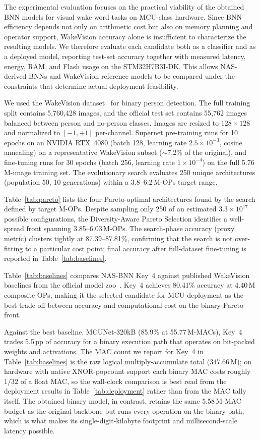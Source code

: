 \documentclass[conference]{IEEEtran}
\begin{document}
The experimental evaluation focuses on the practical viability of the obtained BNN models for visual wake-word tasks on MCU-class hardware.
Since BNN efficiency depends not only on arithmetic cost but also on memory planning and operator support, WakeVision accuracy alone is insufficient to characterize the resulting models.
We therefore evaluate each candidate both as a classifier and as a deployed model, reporting test-set accuracy together with measured latency, energy, RAM, and Flash usage on the STM32H7B3I-DK.
This allows NAS-derived BNNs and WakeVision reference models to be compared under the constraints that determine actual deployment feasibility.

We used the WakeVision dataset~\cite{banbury2025wakevision} for binary person detection. The full training split contains 5{,}760{,}428 images, and the official test set contains 55{,}762 images balanced between person and no-person classes. Images are resized to $128 \times 128$ and normalized to $[-1,+1]$ per-channel. Supernet pre-training runs for 10 epochs on an NVIDIA RTX~4080 (batch 128, learning rate $2.5\times10^{-3}$, cosine annealing) on a representative WakeVision subset ($\sim${7.2}\% of the original), and fine-tuning runs for 30 epochs (batch 256, learning rate $1\times10^{-4}$) on the full 5.76\,M-image training set. The evolutionary search evaluates 250 unique architectures (population 50, 10 generations) within a 3.8--6.2\,M-OPs target range.

Table~\ref{tab:pareto} lists the four Pareto-optimal architectures found by the search defined by target M-OPs.
Despite sampling only 250 of an estimated $3.3\times10^{17}$ possible configurations, the Diversity-Aware Pareto Selection identifies a well-spread front spanning 3.85--6.03\,M-OPs.
The search-phase accuracy (proxy metric) clusters tightly at 87.39--87.81\%, confirming that the search is not over-fitting to a particular cost point; final accuracy after full-dataset fine-tuning is reported in Table~\ref{tab:baselines}.

Table~\ref{tab:baselines} compares NAS-BNN Key~4 against published WakeVision baselines from the official model zoo~\cite{banbury2025wakevision}. Key~4 achieves 80.41\% accuracy at 4.40\,M composite OPs, making it the selected candidate for MCU deployment as the best trade-off between accuracy and computational cost on the binary Pareto front.

Against the best baseline, MCUNet-320kB (85.9\% at 55.77\,M-MACs), Key~4 trades 5.5\,pp of accuracy for a binary execution path that operates on bit-packed weights and activations. The MAC count we report for Key~4 in Table~\ref{tab:baselines} is the raw logical multiply-accumulate total (347.66\,M); on hardware with native XNOR-popcount support each binary MAC costs roughly $1/32$ of a float MAC, so the wall-clock comparison is best read from the deployment results in Table~\ref{tab:deployment} rather than from the MAC tally itself. The obtained binary model, in contrast, retains the same 5.58\,M-MAC budget as the original backbone but runs every operation on the binary path, which is what makes its single-digit-kilobyte footprint and millisecond-scale latency possible.
\end{document}
